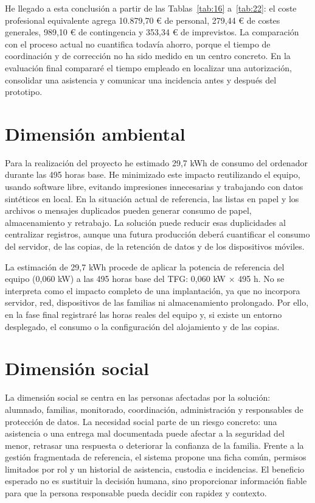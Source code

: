 He llegado a esta conclusión a partir de las Tablas~\ref{tab:16} a~\ref{tab:22}: el coste profesional equivalente agrega 10.879,70 € de personal, 279,44 € de costes generales, 989,10 € de contingencia y 353,34 € de imprevistos. La comparación con el proceso actual no cuantifica todavía ahorro, porque el tiempo de coordinación y de corrección no ha sido medido en un centro concreto. En la evaluación final compararé el tiempo empleado en localizar una autorización, consolidar una asistencia y comunicar una incidencia antes y después del prototipo.

\section{Dimensión ambiental}\label{sec:5-4}

Para la realización del proyecto he estimado 29,7 kWh de consumo del ordenador durante las 495 horas base. He minimizado este impacto reutilizando el equipo, usando software libre, evitando impresiones innecesarias y trabajando con datos sintéticos en local. En la situación actual de referencia, las listas en papel y los archivos o mensajes duplicados pueden generar consumo de papel, almacenamiento y retrabajo. La solución puede reducir esas duplicidades al centralizar registros, aunque una futura producción deberá cuantificar el consumo del servidor, de las copias, de la retención de datos y de los dispositivos móviles.

La estimación de 29,7 kWh procede de aplicar la potencia de referencia del equipo (0,060 kW) a las 495 horas base del TFG: 0,060 kW $\times$ 495 h. No se interpreta como el impacto completo de una implantación, ya que no incorpora servidor, red, dispositivos de las familias ni almacenamiento prolongado. Por ello, en la fase final registraré las horas reales del equipo y, si existe un entorno desplegado, el consumo o la configuración del alojamiento y de las copias.

\section{Dimensión social}\label{sec:5-5}

La dimensión social se centra en las personas afectadas por la solución: alumnado, familias, monitorado, coordinación, administración y responsables de protección de datos. La necesidad social parte de un riesgo concreto: una asistencia o una entrega mal documentada puede afectar a la seguridad del menor, retrasar una respuesta o deteriorar la confianza de la familia. Frente a la gestión fragmentada de referencia, el sistema propone una ficha común, permisos limitados por rol y un historial de asistencia, custodia e incidencias. El beneficio esperado no es sustituir la decisión humana, sino proporcionar información fiable para que la persona responsable pueda decidir con rapidez y contexto.

